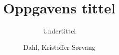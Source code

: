 \documentclass[noprint,norsk]{uit-thesis}
\begin{document}

\title{Oppgavens tittel}
\subtitle{Undertittel}			%
\author{Dahl, Kristoffer Sørvang}

\maketitle


\frontmatter
%
%
\begingroup
\let\cleardoublepage\relax
%
\endgroup
{}

%
%

%

\tableofcontents

\mainmatter

%
%
%
%
%



%

\backmatter
\end{document}
